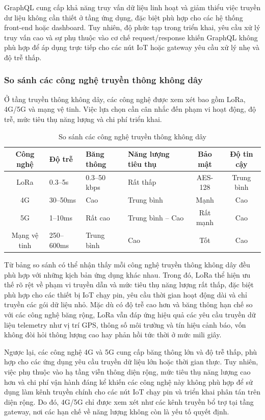 GraphQL cung cấp khả năng truy vấn dữ liệu linh hoạt và giảm thiểu việc truyền dư
liệu không cần thiết ở tầng ứng dụng, đặc biệt phù hợp cho các hệ thống front-end
hoặc dashboard. Tuy nhiên, độ phức tạp trong triển khai, yêu cầu xử lý truy vấn
cao và sự phụ thuộc vào cơ chế request/response khiến GraphQL không phù hợp để áp
dụng trực tiếp cho các nút IoT hoặc gateway yêu cầu xử lý nhẹ và độ trễ thấp.

\subsubsection{So sánh các công nghệ truyền thông không dây}

Ở tầng truyền thông không dây, các công nghệ được xem xét bao gồm LoRa, 4G/5G và
mạng vệ tinh. Việc lựa chọn cần cân nhắc đến phạm vi hoạt động, độ trễ, mức tiêu
thụ năng lượng và chi phí triển khai.

\begin{table}[H]
\centering
\begin{tabularx}{\textwidth}{|c|X|X|X|c|c|}
\hline
\textbf{Công nghệ} & \textbf{Độ trễ} & \textbf{Băng thông} & \textbf{Năng lượng tiêu thụ} & \textbf{Bảo mật} & \textbf{Độ tin cậy} \\
\hline
LoRa & 0.3--5s & 0.3--50 kbps & Rất thấp & AES-128 & Trung bình \\
\hline
4G & 30--50ms & Cao & Trung bình & Mạnh & Cao \\
\hline
5G & 1--10ms & Rất cao & Trung bình -- Cao & Rất mạnh & Cao \\
\hline
Mạng vệ tinh & 250--600ms & Trung bình & Cao & Tốt & Cao \\
\hline
\end{tabularx}
\caption{So sánh các công nghệ truyền thông không dây}
\end{table}


Từ bảng so sánh có thể nhận thấy mỗi công nghệ truyền thông không dây đều phù hợp
với những kịch bản ứng dụng khác nhau. Trong đó, LoRa thể hiện ưu thế rõ rệt về
phạm vi truyền dẫn và mức tiêu thụ năng lượng rất thấp, đặc biệt phù hợp cho các
thiết bị IoT chạy pin, yêu cầu thời gian hoạt động dài và chỉ truyền các gói dữ
liệu nhỏ. Mặc dù có độ trễ cao hơn và băng thông hạn chế so với các công nghệ băng
rộng, LoRa vẫn đáp ứng hiệu quả các yêu cầu truyền dữ liệu telemetry như vị trí
GPS, thông số môi trường và tín hiệu cảnh báo, vốn không đòi hỏi thông lượng cao
hay phản hồi tức thời ở mức mili giây.

Ngược lại, các công nghệ 4G và 5G cung cấp băng thông lớn và độ trễ thấp, phù hợp
cho các ứng dụng yêu cầu truyền dữ liệu lớn hoặc thời gian thực. Tuy nhiên, việc
phụ thuộc vào hạ tầng viễn thông diện rộng, mức tiêu thụ năng lượng cao hơn và chi
phí vận hành đáng kể khiến các công nghệ này không phù hợp để sử dụng làm kênh
truyền chính cho các nút IoT chạy pin và triển khai phân tán trên diện rộng. Do
đó, 4G/5G chỉ được xem xét như các kênh truyền bổ trợ tại tầng gateway, nơi các
hạn chế về năng lượng không còn là yếu tố quyết định.

